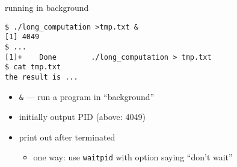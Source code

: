 \begin{frame}[fragile,label=background]{running in background}
\begin{Verbatim}[fontsize=\small]
$ ./long_computation >tmp.txt &
[1] 4049
$ ...
[1]+    Done        ./long_computation > tmp.txt
$ cat tmp.txt
the result is ...
\end{Verbatim}
\begin{itemize}
\item \verb|&| --- run a program in ``background''
\item initially output PID (above: 4049)
\item print out after terminated
    \begin{itemize}
    \item one way: use \texttt{waitpid} with option saying ``don't wait''
    \end{itemize}
\end{itemize}
\end{frame}
